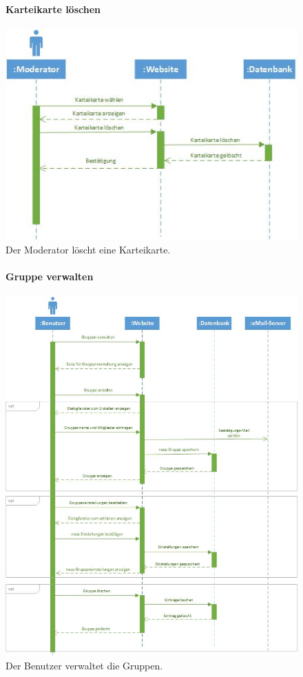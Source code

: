 \documentclass[12pt,a4paper]{article}
\begin{document}
\begin{figure}[H]
	\centering
	\paragraph{Karteikarte löschen}
	\includegraphics[width=\textwidth]{Bilder/Sequenzdiagramme/KarteikarteLoeschen1.jpg}
	\caption{Der Moderator löscht eine Karteikarte.}
	\label{SzKarteikarteLoeschen}
\end{figure}
\begin{figure}[H]
	\centering
	\paragraph{Gruppe verwalten}
	\includegraphics[width=\textwidth]{Bilder/Sequenzdiagramme/GruppenVerwalten1.jpg}
	\caption{Der Benutzer verwaltet die Gruppen.}
	\label{SzGruppenVerwalten}
\end{figure}
\end{document}
